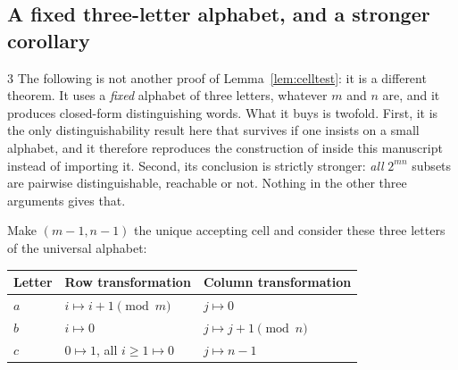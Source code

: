 \documentclass[11pt,letterpaper]{article}
\numberwithin{equation}{section}
\theoremstyle{definition}
\theoremstyle{remark}
\begin{document}
\subsection{A fixed three-letter alphabet, and a stronger corollary}
\label{sec:three-letter}
\begin{variantbox}{3}
The following is not another proof of Lemma~\ref{lem:celltest}: it is a
different theorem. It uses a \emph{fixed} alphabet of three letters, whatever
$m$ and $n$ are, and it produces closed-form distinguishing words. What it
buys is twofold. First, it is the only distinguishability result here that
survives if one insists on a small alphabet, and it therefore reproduces the
construction of \cite{BJLRS2016} inside this manuscript instead of importing
it. Second, its conclusion is strictly stronger: \emph{all} $2^{mn}$ subsets
are pairwise distinguishable, reachable or not. Nothing in the other three
arguments gives that.
\end{variantbox}

Make $(m-1,n-1)$ the unique accepting cell and consider these three letters of
the universal alphabet:
\begin{center}
\begin{tabular}{lll}
\toprule
Letter & Row transformation & Column transformation\\
\midrule
$a$ & $i\mapsto i+1\pmod m$ & $j\mapsto0$\\
$b$ & $i\mapsto0$ & $j\mapsto j+1\pmod n$\\
$c$ & $0\mapsto1$, all $i\ge1\mapsto0$ & $j\mapsto n-1$\\
\bottomrule
\end{tabular}
\end{center}
\end{document}

